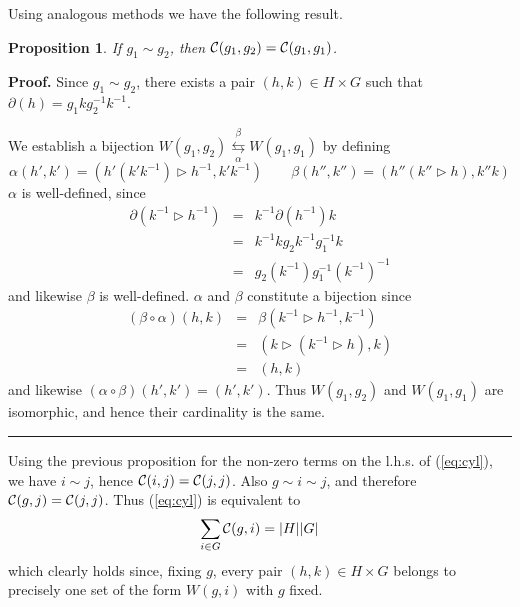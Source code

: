 \documentclass[a4paper,11pt]{article}
\newtheorem{Proposition}[Theorem]{Proposition}
\newenvironment{Proof}[1][Proof]{\textbf{#1.} }{\ \rule{0.5em}{0.5em}}
\def \tr {\triangleright}
\begin{document}
Using analogous methods we have the following result.
\begin{Proposition} 
If $g_1 \sim g_2$, then ${\cal C}(g_1,g_2)={\cal C}(g_1,g_1)$.
\end{Proposition}
\begin{Proof}
Since $g_1 \sim g_2$, there exists a pair $(h,k)\in H\times G$ such that 
$\partial(h) = g_1 k g_2^{-1} k^{-1} $.

We establish a bijection $W(g_1,g_2) \underset{\alpha}{\overset{\beta}{\leftrightarrows}}  
W(g_1,g_1)$ by defining
$$
\alpha(h',k')=(h'(k'k^{-1})\tr h^{-1}, k'k^{-1}) \qquad 
\beta(h'',k'') = (h''(k''\tr h),k''k)
$$
$\alpha$ is well-defined, since 
\begin{eqnarray*}
\partial(k^{-1}\tr h^{-1}) & = & k^{-1} \partial(h^{-1}) k  \\
& = & k^{-1} kg_2k^{-1}g_1^{-1}k \\
& = & g_2(k^{-1})g_1^{-1} (k^{-1})^{-1}
\end{eqnarray*}
and likewise $\beta$ is well-defined. 
$\alpha$ and $\beta$ constitute a bijection since 
\begin{eqnarray*}
(\beta\circ\alpha)(h,k) & = & \beta(k^{-1}\tr h^{-1}, k^{-1}) \\
& = & (k\tr (k^{-1}\tr h),k) \\
& = & (h,k)
\end{eqnarray*}
and likewise $(\alpha\circ\beta)(h',k')=(h',k')$. Thus $W(g_1,g_2)$ and  $W(g_1,g_1)$ are isomorphic, and hence their cardinality is the same. 
\end{Proof}
\vskip 0.2cm




Using the previous proposition for the non-zero terms on the l.h.s. of (\ref{eq:cyl}), we have $i\sim j$, hence ${\cal C}(i,j)={\cal C}(j,j)$. Also
$g\sim i\sim j$, and therefore ${\cal C}(g,j)={\cal C}(j,j)$. Thus (\ref{eq:cyl}) is equivalent to
$$
\sum_{i\in G}{\cal C}(g,i)=|H||G|
$$
which clearly holds since, fixing $g$, every pair $(h,k)\in H 	\times G$ belongs to precisely one set of the form $W(g,i)$ with $g$ fixed.
\end{document}
